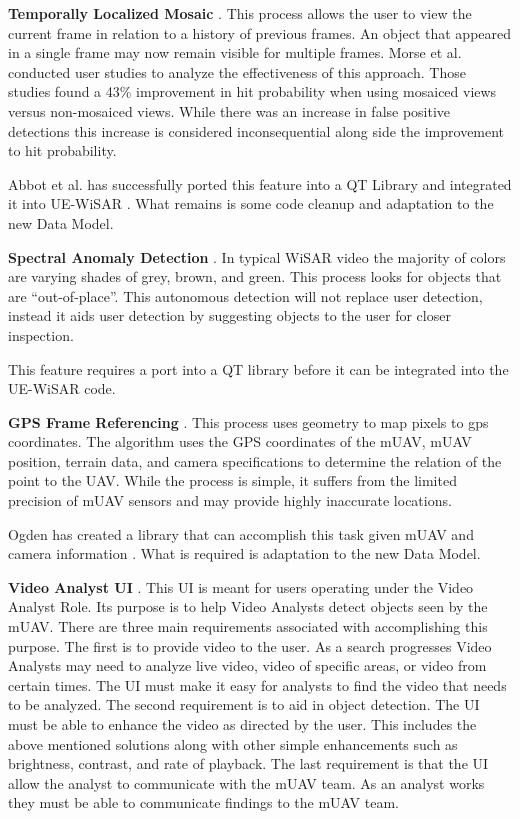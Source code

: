 \documentclass[12pt]{IEEEtran}
\begin{document}
\textbf{Temporally Localized Mosaic} \cite{morse2008application,
cluff2009unified}.  This process allows the user to view the current frame in relation to a history of previous frames.  An object that appeared in a
single frame may now remain visible for multiple frames.  Morse et al. conducted
user studies to analyze the effectiveness of this
approach.  Those studies found a 43\% improvement in
hit probability when using mosaiced views versus non-mosaiced views.  While
there was an increase in false positive detections this increase is considered
inconsequential along side the improvement to hit probability.

Abbot et al. has successfully ported this feature into a QT Library and
integrated it into UE-WiSAR \cite{serverCode}.  What remains is some code
cleanup and adaptation to the new Data Model.

\textbf{Spectral Anomaly Detection} \cite{thornton2011detection,
rasmussen2008enhancement}.  In typical WiSAR video the majority of colors are
varying shades of grey, brown, and green.  This process looks for objects that
are ``out-of-place''.  This autonomous detection will not replace user
detection, instead it aids user detection by suggesting objects to the user for
closer inspection.

This feature requires a port into a QT library before
it can be integrated into the UE-WiSAR code.

\textbf{GPS Frame Referencing} \cite{morse2010coverage}.  This process uses
geometry to map pixels to gps coordinates.  The
algorithm uses the GPS coordinates of the mUAV, mUAV position, terrain data,
and camera specifications to determine the relation of the point to the UAV. 
While the process is simple, it suffers from the limited precision of mUAV
sensors and may provide highly inaccurate locations.

Ogden has created a library that can accomplish this task given mUAV and camera
information \cite{serverCode}.  What is required is adaptation to the new Data
Model.

\textbf{Video Analyst UI} \cite{lin2010supporting}.  This UI is meant for users
operating under the Video Analyst Role.  Its purpose is to help Video
Analysts detect objects seen by the mUAV.  There are three main requirements
associated with accomplishing this purpose.  The first is to provide video to
the user.  As a search progresses Video Analysts may need to analyze live video,
video of specific areas, or video from certain times.  The UI must make it easy
for analysts to find the video that needs to be analyzed.  The second
requirement is to aid in object detection.  The UI must be able to enhance the
video as directed by the user.  This includes the above mentioned solutions
along with other simple enhancements such as brightness, contrast, and rate of
playback.  The last requirement is that the UI allow the analyst to communicate
with the mUAV team.  As an analyst works they must be able to communicate
findings to the mUAV team.
\end{document}
